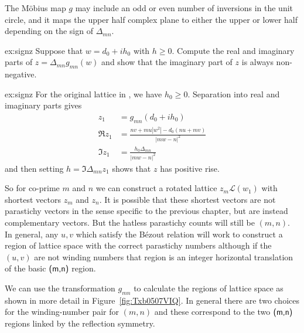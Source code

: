 The M\"obius map $g$ may include an odd or even number of inversions in the unit circle, and it maps the upper half complex plane to either the upper or lower half depending on the sign of $\Delta_{mn}$. 

\begin{jExercise}{ex:signz}
	Suppose that $w=d_0+ih_0$ with $h\geq 0$. Compute the real and imaginary parts of $z = \Delta_{mn}g_{mn}(w)$ and show that the imaginary part of $z$ is always non-negative.
\end{jExercise}

\begin{jAnswer}{ex:signz}
For the original lattice in , we have $h_0\geq0$. Separation into real and imaginary parts  gives
	\begin{align}
		z_1 &= g_{mn}(d_0+ih_0) 
		\\
		\Re z_1 &= 
		\frac{n v + m u| w^2|	- d_0( n u + m v)}{|m w-n|^2} 
			\\
			\Im z_1 &=
	\frac{	 h_0 \Delta_{mn}}{|m w-n|^2}
	\label{eq:gReImA}
\end{align}
and then setting $h=\Im \Delta_{mn}z_1$ shows that $z$ has positive rise.
\end{jAnswer}

 So for co-prime $m$ and $n$ we can construct a rotated lattice $z_m \mathcal{L}(w_1)$  with shortest vectors $z_m$ and $z_n$. It is possible that these shortest vectors are not parastichy vectors in the sense specific to the previous chapter, but are instead complementary vectors. But the hatless parastichy counts will still be $(m,n)$. In general, any $u,v$ which satisfy the B\'ezout relation will work to construct a region of lattice space with the correct parastichy numbers although if the $(u,v)$ are not winding numbers that region is an integer horizontal translation of the basic $\textsf{(m,n)}$ region.
 	


We can use the transformation $g_{mn}$ to calculate the regions of
lattice space as shown in more detail in Figure~\ref{fig:Txb0507VIQ}.
In general there are two choices for the winding-number pair for $(m,n)$ and these correspond to the two $\textsf{(m,n)}$ regions linked by the reflection symmetry.



